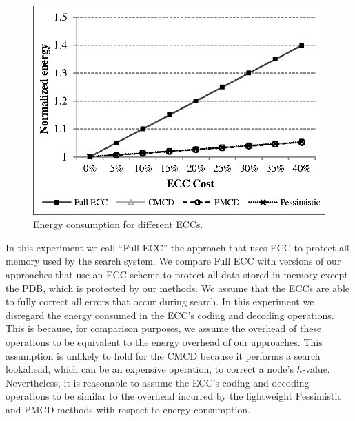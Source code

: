 \documentclass[letterpaper]{article}
\begin{document}
\begin{figure}[!htb]
\centering
\includegraphics[scale=.9]{figures/ecc_chart.eps}
\caption{Energy consumption for different ECCs.}
\label{fig:ecc}
\end{figure}

In this experiment we call ``Full ECC'' the approach that uses ECC to protect all memory used by the search system. We compare Full ECC with versions of our approaches that use an ECC scheme to protect all data stored in memory except the PDB, which is protected by our methods. We assume that the ECCs are able to fully correct all errors that occur during search. In this experiment we disregard the energy consumed in the ECC's coding and decoding operations. This is because, for comparison purposes, we assume the overhead of these operations to be equivalent to the energy 
overhead of our approaches. This assumption is unlikely to hold for the CMCD because it performs a search lookahead, which can be an expensive operation, to correct a node's $h$-value. Nevertheless, it is reasonable to assume the ECC's coding and decoding operations to be similar to the overhead incurred by the lightweight Pessimistic and PMCD methods with respect to energy consumption. 

\end{document}
